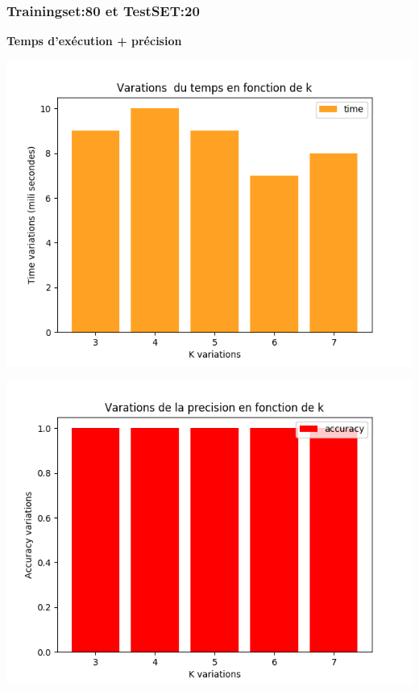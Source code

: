 \documentclass[12pt,a4paper,oneside]{book}
\begin{document}
	
	
	
	\subsubsection{Trainingset:80 et TestSET:20}
	
	\textbf{Temps d'exécution + précision}\\
	\begin{frame}{}
		\centering
		\begin{minipage}[b]{0.5\linewidth}
			\includegraphics[scale=0.5]{image/labor:Train,80,Test,20time.png}
			\label{labelname}%
		\end{minipage}
		\hspace{0.5cm}
		\begin{minipage}[b]{0.5\linewidth}
			\includegraphics[scale=0.5]{image/labor:Train,80,Test,20:accuracy.png}%
			\label{labelname}%
		\end{minipage}
	\end{frame}
	
\end{document}
